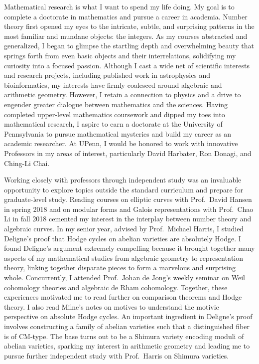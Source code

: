 \documentclass[11pt]{article}
\begin{document}
Mathematical research is what I want to spend my life doing. My goal is to complete a doctorate in mathematics and pursue a career in academia. Number theory first opened my eyes to the intricate, subtle, and surprising patterns in the most familiar and mundane objects: the integers. As my courses abstracted and generalized, I began to glimpse the startling depth and overwhelming beauty that springs forth from even basic objects and their interrelations, solidifying my curiosity into a focused passion. Although I cast a wide net of scientific interests and research projects, including published work in astrophysics and bioinformatics, my interests have firmly coalesced around algebraic and arithmetic geometry. However, I retain a connection to physics and a drive to engender greater dialogue between mathematics and the sciences. Having completed upper-level mathematics coursework and dipped my toes into mathematical research, I aspire to earn a doctorate at the University of Pennsylvania to pursue mathematical mysteries and build my career as an academic researcher. At UPenn, I would be honored to work with innovative Professors in my areas of interest, particularly David Harbater, Ron Donagi, and Ching-Li Chai.
\par
Working closely with professors through independent study was an invaluable opportunity to explore topics outside the standard curriculum and prepare for graduate-level study. 
Reading courses on elliptic curves with Prof.\ David Hansen in spring 2018 and on modular forms and Galois representations with Prof.\ Chao Li in fall 2018 cemented my interest in the interplay between number theory and algebraic curves. In my senior year, advised by Prof.\ Michael Harris, I studied Deligne's proof that Hodge cycles on abelian varieties are absolutely Hodge. I found Deligne's argument extremely compelling because it brought together many aspects of my mathematical studies from algebraic geometry to representation theory, linking together disparate pieces to form a marvelous and surprising whole. Concurrently, I attended Prof.\ Johan de Jong's weekly seminar on Weil cohomology theories and algebraic de Rham cohomology. Together, these experiences motivated me to read further on comparison theorems and Hodge theory. I also read Milne's notes on motives to understand the motivic perspective on absolute Hodge cycles. An important ingredient in Deligne's proof involves constructing a family of abelian varieties such that a distinguished fiber is of CM-type. The base turns out to be a Shimura variety encoding moduli of abelian varieties, sparking my interest in arithmetic geometry and leading me to pursue further independent study with Prof.\ Harris on Shimura varieties.
\end{document}
